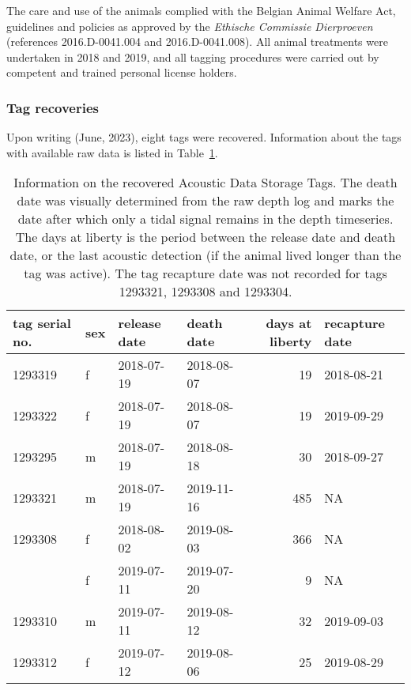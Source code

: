 \documentclass[
  authoryear,
  review,
  3p]{elsarticle}
\begin{document}
The care and use of the animals complied with the Belgian Animal Welfare
Act, guidelines and policies as approved by the \emph{Ethische Commissie
Dierproeven} (references 2016.D-0041.004 and 2016.D-0041.008). All
animal treatments were undertaken in 2018 and 2019, and all tagging
procedures were carried out by competent and trained personal license
holders.

\hypertarget{tag-recoveries}{%
\subsubsection{Tag recoveries}\label{tag-recoveries}}

Upon writing (June, 2023), eight tags were recovered. Information about
the tags with available raw data is listed in Table~\ref{tbl-dstsum}.

\hypertarget{tbl-dstsum}{}
\begin{table}[H]
\caption{\label{tbl-dstsum}Information on the recovered Acoustic Data Storage Tags. The death date
was visually determined from the raw depth log and marks the date after
which only a tidal signal remains in the depth timeseries. The days at
liberty is the period between the release date and death date, or the
last acoustic detection (if the animal lived longer than the tag was
active). The tag recapture date was not recorded for tags 1293321,
1293308 and 1293304. }\tabularnewline

\centering
\fontsize{10}{12}\selectfont
\begin{tabular}{llllrl}
\toprule
\textbf{tag serial no.} & \textbf{sex} & \textbf{release date} & \textbf{death date} & \textbf{days at liberty} & \textbf{recapture date}\\
\midrule
1293319 & f & 2018-07-19 & 2018-08-07 & 19 & 2018-08-21\\
1293322 & f & 2018-07-19 & 2018-08-07 & 19 & 2019-09-29\\
1293295 & m & 2018-07-19 & 2018-08-18 & 30 & 2018-09-27\\
1293321 & m & 2018-07-19 & 2019-11-16 & 485 & NA\\
1293308 & f & 2018-08-02 & 2019-08-03 & 366 & NA\\
\addlinespace
1293304 & f & 2019-07-11 & 2019-07-20 & 9 & NA\\
1293310 & m & 2019-07-11 & 2019-08-12 & 32 & 2019-09-03\\
1293312 & f & 2019-07-12 & 2019-08-06 & 25 & 2019-08-29\\
\bottomrule
\end{tabular}
\end{table}
\end{document}
